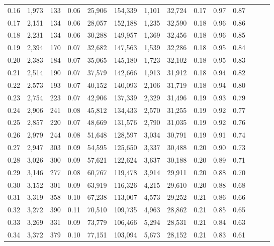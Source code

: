 \begin{tabular}{rrrrrrrrrrrrrr}
0.16 &  1,973 &    133 &  0.06 &   25,906 &  154,339 &   1,101 &  32,724 &  0.17 &  0.97 &      0.87 \\
0.17 &  2,151 &    134 &  0.06 &   28,057 &  152,188 &   1,235 &  32,590 &  0.18 &  0.96 &      0.86 \\
0.18 &  2,231 &    134 &  0.06 &   30,288 &  149,957 &   1,369 &  32,456 &  0.18 &  0.96 &      0.85 \\
0.19 &  2,394 &    170 &  0.07 &   32,682 &  147,563 &   1,539 &  32,286 &  0.18 &  0.95 &      0.84 \\
0.20 &  2,383 &    184 &  0.07 &   35,065 &  145,180 &   1,723 &  32,102 &  0.18 &  0.95 &      0.83 \\
0.21 &  2,514 &    190 &  0.07 &   37,579 &  142,666 &   1,913 &  31,912 &  0.18 &  0.94 &      0.82 \\
0.22 &  2,573 &    193 &  0.07 &   40,152 &  140,093 &   2,106 &  31,719 &  0.18 &  0.94 &      0.80 \\
0.23 &  2,754 &    223 &  0.07 &   42,906 &  137,339 &   2,329 &  31,496 &  0.19 &  0.93 &      0.79 \\
0.24 &  2,906 &    241 &  0.08 &   45,812 &  134,433 &   2,570 &  31,255 &  0.19 &  0.92 &      0.77 \\
0.25 &  2,857 &    220 &  0.07 &   48,669 &  131,576 &   2,790 &  31,035 &  0.19 &  0.92 &      0.76 \\
0.26 &  2,979 &    244 &  0.08 &   51,648 &  128,597 &   3,034 &  30,791 &  0.19 &  0.91 &      0.74 \\
0.27 &  2,947 &    303 &  0.09 &   54,595 &  125,650 &   3,337 &  30,488 &  0.20 &  0.90 &      0.73 \\
0.28 &  3,026 &    300 &  0.09 &   57,621 &  122,624 &   3,637 &  30,188 &  0.20 &  0.89 &      0.71 \\
0.29 &  3,146 &    277 &  0.08 &   60,767 &  119,478 &   3,914 &  29,911 &  0.20 &  0.88 &      0.70 \\
0.30 &  3,152 &    301 &  0.09 &   63,919 &  116,326 &   4,215 &  29,610 &  0.20 &  0.88 &      0.68 \\
0.31 &  3,319 &    358 &  0.10 &   67,238 &  113,007 &   4,573 &  29,252 &  0.21 &  0.86 &      0.66 \\
0.32 &  3,272 &    390 &  0.11 &   70,510 &  109,735 &   4,963 &  28,862 &  0.21 &  0.85 &      0.65 \\
0.33 &  3,269 &    331 &  0.09 &   73,779 &  106,466 &   5,294 &  28,531 &  0.21 &  0.84 &      0.63 \\
0.34 &  3,372 &    379 &  0.10 &   77,151 &  103,094 &   5,673 &  28,152 &  0.21 &  0.83 &      0.61 \\

\end{tabular}
